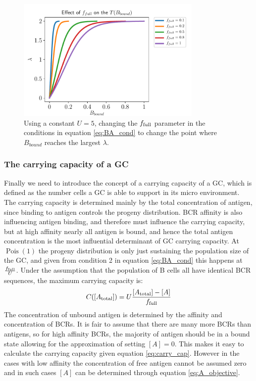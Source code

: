 \begin{figure}
    \centering
    \includegraphics[width=0.8\textwidth]{figures/T_Bbound_f_full.pdf}
    \caption{
        \label{fig:T_Bbound_f_full}
        Using a constant $U = 5$, changing the $f_{\text{full}}$ parameter in the conditions in equation \ref{eq:BA_cond} to change the point where $B_{bound}$ reaches the largest $\lambda$.
    }
\end{figure}








\subsubsection{The carrying capacity of a GC}
Finally we need to introduce the concept of a carrying capacity of a GC, which is defined as the number cells a GC is able to support in its micro environment.
The carrying capacity is determined mainly by the total concentration of antigen, since binding to antigen controls the progeny distribution.
BCR affinity is also influencing antigen binding, and therefore must influence the carrying capacity, but at high affinity nearly all antigen is bound, and hence the total antigen concentration is the most influential determinant of GC carrying capacity.
At $\operatorname{Pois}(1)$ the progeny distribution is only just sustaining the population size of the GC, and given from condition 2 in equation \ref{eq:BA_cond} this happens at $\frac{f_{\text{full}}}{U}$.
Under the assumption that the population of B cells all have identical BCR sequences, the maximum carrying capacity is:
\begin{equation}
C([A_{\text{total}}]) = U \frac{[A_{\text{total}}] - [A]}{f_{\text{full}}}
  \label{eq:carry_cap}
\end{equation}
The concentration of unbound antigen is determined by the affinity and concentration of BCRs.
It is fair to assume that there are many more BCRs than antigens, so for high affinity BCRs, the majority of antigen should be in a bound state allowing for the approximation of setting $[A]=0$.
This makes it easy to calculate the carrying capacity given equation \ref{eq:carry_cap}.
However in the cases with low affinity the concentration of free antigen cannot be assumed zero and in such cases $[A]$ can be determined through equation \ref{eq:A_objective}.

